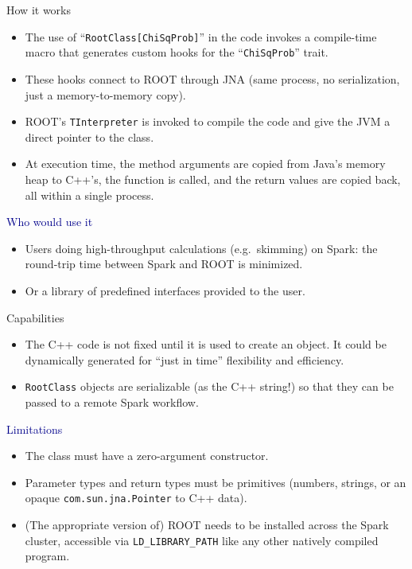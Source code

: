 \documentclass{beamer}
\begin{document}
\begin{frame}{How it works}
\begin{itemize}
\item The use of ``{\tt RootClass[ChiSqProb]}'' in the code invokes a compile-time macro that generates custom hooks for the ``{\tt ChiSqProb}'' trait.
\item These hooks connect to ROOT through JNA (same process, no serialization, just a memory-to-memory copy).
\item ROOT's {\tt TInterpreter} is invoked to compile the code and give the JVM a direct pointer to the class.
\item At execution time, the method arguments are copied from Java's memory heap to C++'s, the function is called, and the return values are copied back, all within a single process.
\end{itemize}

\vfill
\hspace{-0.83 cm} \textcolor{darkblue}{\Large Who would use it}
\begin{itemize}
\item Users doing high-throughput calculations (e.g.\ skimming) on Spark: the round-trip time between Spark and ROOT is minimized.
\item Or a library of predefined interfaces provided to the user.
\end{itemize}
\end{frame}

\begin{frame}{Capabilities}
\begin{itemize}
\item The C++ code is not fixed until it is used to create an object. It could be dynamically generated for ``just in time'' flexibility and efficiency.
\item {\tt RootClass} objects are serializable (as the C++ string!) so that they can be passed to a remote Spark workflow.
\end{itemize}

\vfill
\hspace{-0.83 cm} \textcolor{darkblue}{\Large Limitations}

\begin{itemize}
\item The class must have a zero-argument constructor.
\item Parameter types and return types must be primitives (numbers, strings, or an opaque {\tt com.sun.jna.Pointer} to C++ data).
\item (The appropriate version of) ROOT needs to be installed across the Spark cluster, accessible via {\tt LD\_LIBRARY\_PATH} like any other natively compiled program.
\end{itemize}
\end{frame}
\end{document}
